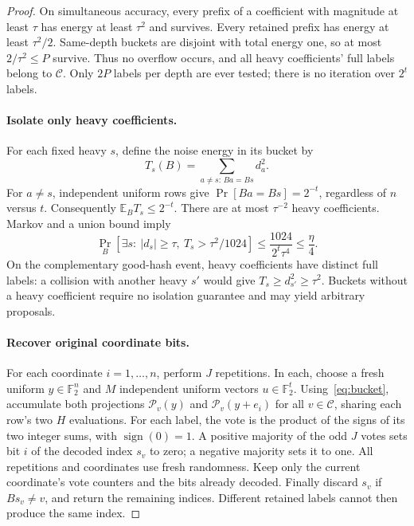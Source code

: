 \documentclass[11pt]{article}
\theoremstyle{remark}\newtheorem{remark}[theorem]{Remark}
\newcommand{\F}{\mathbb F}
\newcommand{\E}{\mathbb E}
\newcommand{\sgn}{\operatorname{sign}}
\begin{document}
\begin{proof}
On simultaneous accuracy, every prefix of a coefficient with magnitude at least $\tau$ has energy at least $\tau^2$ and survives. Every retained prefix has energy at least $\tau^2/2$. Same-depth buckets are disjoint with total energy one, so at most $2/\tau^2\le P$ survive. Thus no overflow occurs, and all heavy coefficients' full labels belong to $\mathcal C$. Only $2P$ labels per depth are ever tested; there is no iteration over $2^t$ labels.

\paragraph{Isolate only heavy coefficients.}
For each fixed heavy $s$, define the noise energy in its bucket by
\[
 T_s(B)=\sum_{a\ne s:\,Ba=Bs}d_a^2.
\]
For $a\ne s$, independent uniform rows give $\Pr[Ba=Bs]=2^{-t}$, regardless of $n$ versus $t$. Consequently $\E_B T_s\le2^{-t}$. There are at most $\tau^{-2}$ heavy coefficients. Markov and a union bound imply
\begin{equation}\label{eq:hashisolation}
 \Pr_B[\exists s:\ |d_s|\ge\tau,\ T_s>\tau^2/1024]
 \le\frac{1024}{2^t\tau^4}\le\frac\eta4.
\end{equation}
On the complementary good-hash event, heavy coefficients have distinct full labels: a collision with another heavy $s'$ would give $T_s\ge d_{s'}^2\ge\tau^2$. Buckets without a heavy coefficient require no isolation guarantee and may yield arbitrary proposals.

\paragraph{Recover original coordinate bits.}
For each coordinate $i=1,\ldots,n$, perform $J$ repetitions. In each, choose a fresh uniform $y\in\F_2^n$ and $M$ independent uniform vectors $u\in\F_2^t$. Using~\eqref{eq:bucket}, accumulate both projections $\mathcal P_v(y)$ and $\mathcal P_v(y+e_i)$ for all $v\in\mathcal C$, sharing each row's two $H$ evaluations. For each label, the vote is the product of the signs of its two integer sums, with $\sgn(0)=1$. A positive majority of the odd $J$ votes sets bit $i$ of the decoded index $s_v$ to zero; a negative majority sets it to one. All repetitions and coordinates use fresh randomness. Keep only the current coordinate's vote counters and the bits already decoded. Finally discard $s_v$ if $Bs_v\ne v$, and return the remaining indices. Different retained labels cannot then produce the same index.


\end{proof}
\end{document}
